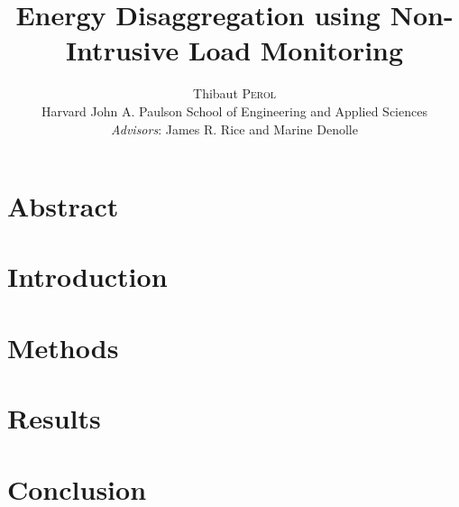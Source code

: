 \documentclass[11pt]{article}
\title{Energy Disaggregation using Non-Intrusive Load Monitoring}
\author{Thibaut \textsc{Perol}\\ \small Harvard John A. Paulson School of Engineering and Applied Sciences\\
\textit{Advisors}: James R. Rice and Marine Denolle}
\date{}
\begin{document}
\maketitle


\section{Abstract}

\section{Introduction}

\section{Methods}

\section{Results}

\section{Conclusion}





\end{document}
